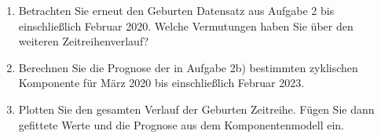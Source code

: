 
\begin{enumerate}

\item Betrachten Sie erneut den Geburten Datensatz aus Aufgabe 2 bis einschließlich Februar 2020. Welche Vermutungen haben Sie über den weiteren Zeitreihenverlauf?


\item Berechnen Sie die Prognose der in Aufgabe 2b) bestimmten zyklischen Komponente für März 2020 bis einschließlich Februar 2023. 


\item Plotten Sie den gesamten Verlauf der Geburten Zeitreihe. Fügen Sie dann gefittete Werte und die Prognose aus dem Komponentenmodell ein.


\end{enumerate}